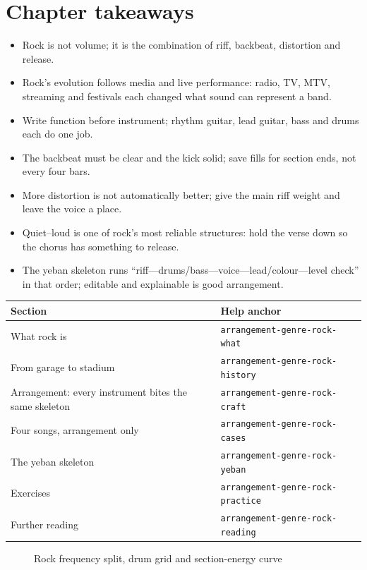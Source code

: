 \section{Chapter takeaways}
\label{sec:rock-takeaways}

\begin{itemize}
\item Rock is not volume; it is the combination of riff, backbeat, distortion and release.
\item Rock's evolution follows media and live performance: radio, TV, MTV, streaming and festivals each changed what sound can represent a band.
\item Write function before instrument; rhythm guitar, lead guitar, bass and drums each do one job.
\item The backbeat must be clear and the kick solid; save fills for section ends, not every four bars.
\item More distortion is not automatically better; give the main riff weight and leave the voice a place.
\item Quiet--loud is one of rock's most reliable structures: hold the verse down so the chorus has something to release.
\item The yeban skeleton runs ``riff---drums/bass---voice---lead/colour---level check'' in that order; editable and explainable is good arrangement.
\end{itemize}

\begin{helpmapping}
\begin{longtable}{p{}p{}}
\toprule
Section & Help anchor \\
\midrule
What rock is & \texttt{arrangement-genre-rock-what} \\
From garage to stadium & \texttt{arrangement-genre-rock-history} \\
Arrangement: every instrument bites the same skeleton & \texttt{arrangement-genre-rock-craft} \\
Four songs, arrangement only & \texttt{arrangement-genre-rock-cases} \\
The yeban skeleton & \texttt{arrangement-genre-rock-yeban} \\
Exercises & \texttt{arrangement-genre-rock-practice} \\
Further reading & \texttt{arrangement-genre-rock-reading} \\
\bottomrule
\end{longtable}
\end{helpmapping}

\begin{figure}[htbp]\centering
{}
\caption{Rock frequency split, drum grid and section-energy curve}
\end{figure}
